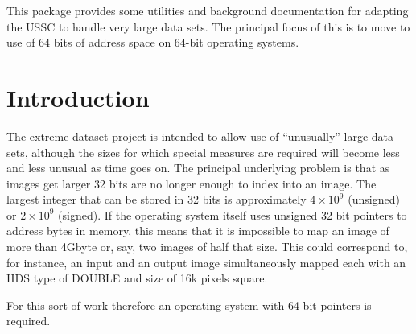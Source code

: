 \documentclass[twoside,11pt]{article}
\newcommand{\stardocinitials}  {SSN}
\newcommand{\stardocnumber}    {73.1}
\newcommand{\stardocabstract}  {
This package provides some utilities and background documentation 
for adapting the USSC to handle very large data sets.
The principal focus of this is to move to use of 64 bits of address
space on 64-bit operating systems.
}
\newcommand{\stardocname}{\stardocinitials /\stardocnumber}
\newenvironment{latexonly}{}{}
\renewcommand{\_}{\texttt{\symbol{95}}}
\renewcommand{\thepage}{\roman{page}}
\begin{document}
\stardocabstract
  \newpage
  \begin{latexonly}
    \setlength{\parskip}{0mm}
    \tableofcontents
    \setlength{\parskip}{\medskipamount}
    \markboth{\stardocname}{\stardocname}
  \end{latexonly}
\cleardoublepage
\renewcommand{\thepage}{\arabic{page}}
\setcounter{page}{1}



\newcommand{\xroutine}[1]{#1}
\newcommand{\cc}[1]{{\tt #1}}
\newenvironment{squote}{\begin{quote}\begin{small}}{\end{small}\end{quote}}

\section{Introduction}

The extreme dataset project is intended to allow use of ``unusually''
large data sets, although the sizes for which special measures
are required will become less and less unusual as time goes on.
The principal underlying problem is that as images get larger
32 bits are no longer enough to index into an image.
The largest integer that can be stored in 32 bits 
is approximately $4 \times 10^9$ (unsigned) or $2 \times 10^9$ (signed).
If the operating system itself uses unsigned 32 bit pointers to 
address bytes
in memory, this means that it is impossible to map an image of more
than 4Gbyte or, say, two images of half that size. 
This could correspond to, for instance, an input and an output image
simultaneously mapped each with an HDS type of \_DOUBLE and 
size of 16k pixels square.

For this sort of work therefore an operating system with 64-bit 
pointers is required.
\end{document}
